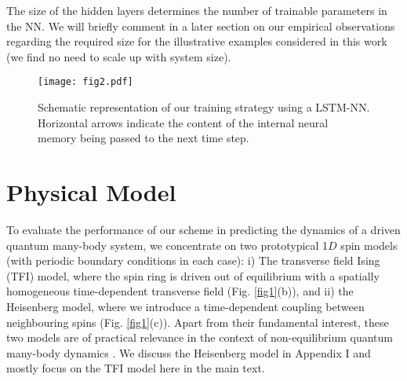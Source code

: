 \documentclass[a4paper,aps,amsmath,amssymb,twocolumn,longbibliography,,accepted=2022-05-17]{quantumarticle}
\begin{document}
The size of the hidden layers determines the number of trainable parameters in the NN. We will briefly comment in a later section on our empirical observations regarding the required size for the illustrative examples considered in this work (we find no need to scale up with system size).






\begin{figure}[]
	\centering
	\texttt{[image: fig2.pdf]}
	\caption {Schematic representation of our training strategy using a LSTM-NN. Horizontal arrows indicate the content of the internal neural memory being passed to the next time step.
	}
	\label{fig1_2}
\end{figure}


\section{Physical Model\label{Model}}


To evaluate the performance of our scheme in predicting the dynamics of a driven quantum many-body system, we concentrate on two prototypical 1$D$ spin models (with periodic boundary conditions in each case): i) The transverse field Ising (TFI) model, where the spin ring is driven out of equilibrium with a spatially homogeneous time-dependent transverse field (Fig. \ref{fig1}(b)), and ii) the Heisenberg model, where we introduce a time-dependent coupling between neighbouring spins (Fig. \ref{fig1}(c)). Apart from their fundamental interest, these two models are of practical relevance in the context of non-equilibrium quantum many-body dynamics \cite{PhysRevB.98.024311, heyl2012nonequilibrium}. We discuss the Heisenberg model in Appendix I  and mostly focus on the TFI model here in the main text. 
\end{document}
